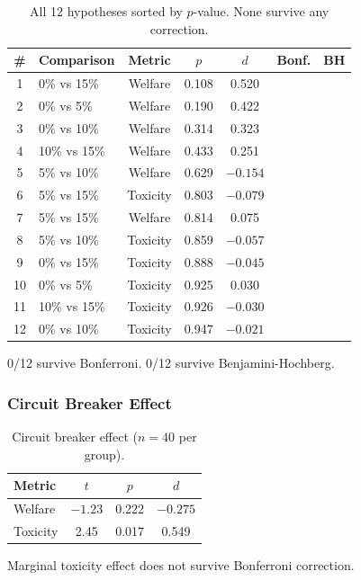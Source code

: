 \documentclass[11pt]{article}
\begin{document}
\begin{table}[H]
\centering
\caption{All 12 hypotheses sorted by $p$-value. None survive any correction.}
\small
\begin{tabular}{@{}clccccc@{}}
\toprule
\# & Comparison & Metric & $p$ & $d$ & Bonf. & BH \\
\midrule
1 & 0\% vs 15\% & Welfare & 0.108 & 0.520 & & \\
2 & 0\% vs 5\% & Welfare & 0.190 & 0.422 & & \\
3 & 0\% vs 10\% & Welfare & 0.314 & 0.323 & & \\
4 & 10\% vs 15\% & Welfare & 0.433 & 0.251 & & \\
5 & 5\% vs 10\% & Welfare & 0.629 & $-0.154$ & & \\
6 & 5\% vs 15\% & Toxicity & 0.803 & $-0.079$ & & \\
7 & 5\% vs 15\% & Welfare & 0.814 & 0.075 & & \\
8 & 5\% vs 10\% & Toxicity & 0.859 & $-0.057$ & & \\
9 & 0\% vs 15\% & Toxicity & 0.888 & $-0.045$ & & \\
10 & 0\% vs 5\% & Toxicity & 0.925 & 0.030 & & \\
11 & 10\% vs 15\% & Toxicity & 0.926 & $-0.030$ & & \\
12 & 0\% vs 10\% & Toxicity & 0.947 & $-0.021$ & & \\
\bottomrule
\end{tabular}

\vspace{4pt}
\footnotesize 0/12 survive Bonferroni. 0/12 survive Benjamini-Hochberg.
\end{table}

\subsubsection{Circuit Breaker Effect}

\begin{table}[H]
\centering
\caption{Circuit breaker effect ($n = 40$ per group).}
\small
\begin{tabular}{@{}lccc@{}}
\toprule
Metric & $t$ & $p$ & $d$ \\
\midrule
Welfare & $-1.23$ & 0.222 & $-0.275$ \\
Toxicity & 2.45 & 0.017 & 0.549 \\
\bottomrule
\end{tabular}

\vspace{4pt}
\footnotesize Marginal toxicity effect does not survive Bonferroni correction.
\end{table}
\end{document}
